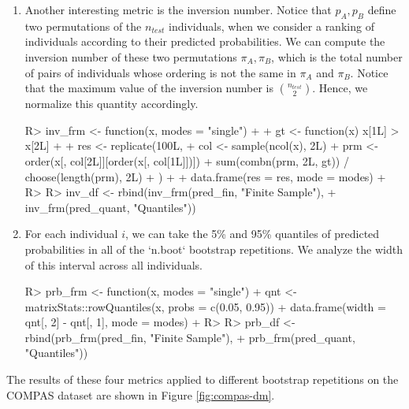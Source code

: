 \documentclass[
  nojss]{jss}
\begin{document}
\begin{enumerate}
\item Another interesting metric is the inversion number. Notice that $p_A, p_B$ define two permutations of the $n_{test}$ individuals, when we consider a ranking of individuals according to their predicted probabilities. We can compute the inversion number of these two permutations $\pi_A, \pi_B$, which is the total number of pairs of individuals whose ordering is not the same in $\pi_A$ and $\pi_B$. Notice that the maximum value of the inversion number is $\binom{n_{test}}{2}$. Hence, we normalize this quantity accordingly.

\begin{CodeChunk}
\begin{CodeInput}
R> inv_frm <- function(x, modes = "single") {
+ 
+   gt <- function(x) x[1L] > x[2L]
+ 
+   res <- replicate(100L, {
+     col <- sample(ncol(x), 2L)
+     prm <- order(x[, col[2L]][order(x[, col[1L]])])
+     sum(combn(prm, 2L, gt)) / choose(length(prm), 2L)
+   })
+ 
+   data.frame(res = res, mode = modes)
+ }
R> 
R> inv_df <- rbind(inv_frm(pred_fin, "Finite Sample"),
+                 inv_frm(pred_quant, "Quantiles"))
\end{CodeInput}
\end{CodeChunk}

\item For each individual $i$, we can take the 5\% and 95\% quantiles of predicted probabilities in all of the `n.boot` bootstrap repetitions. We analyze the width of this interval across all individuals.

\begin{CodeChunk}
\begin{CodeInput}
R> prb_frm <- function(x, modes = "single") {
+   qnt <- matrixStats::rowQuantiles(x, probs = c(0.05, 0.95))
+   data.frame(width = qnt[, 2] - qnt[, 1], mode = modes)
+ }
R> 
R> prb_df <- rbind(prb_frm(pred_fin, "Finite Sample"),
+                 prb_frm(pred_quant, "Quantiles"))
\end{CodeInput}
\end{CodeChunk}

\end{enumerate}

The results of these four metrics applied to different bootstrap
repetitions on the COMPAS dataset are shown in Figure
\ref{fig:compas-dm}.
\end{document}
